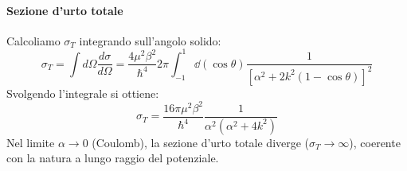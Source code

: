 \begin{example}
    \paragraph{Sezione d'urto totale}
    Calcoliamo \( \sigma_T \) integrando sull'angolo solido:
    \[
        \sigma_T = \int d\Omega \frac{d\sigma}{d\Omega} = \frac{4\mu^2 \beta^2}{\hbar^4} 2\pi \int_{-1}^{1} \dd(\cos\theta) \frac{1}{[\alpha^2 + 2k^2(1-\cos\theta)]^2}
    \]
    Svolgendo l'integrale si ottiene:
    \[
        \sigma_T = \frac{16\pi \mu^2 \beta^2}{\hbar^4} \frac{1}{\alpha^2(\alpha^2 + 4k^2)}
    \]
    Nel limite \( \alpha \to 0 \) (Coulomb), la sezione d'urto totale diverge (\( \sigma_T \to \infty \)), coerente con la natura a lungo raggio del potenziale.
\end{example}
